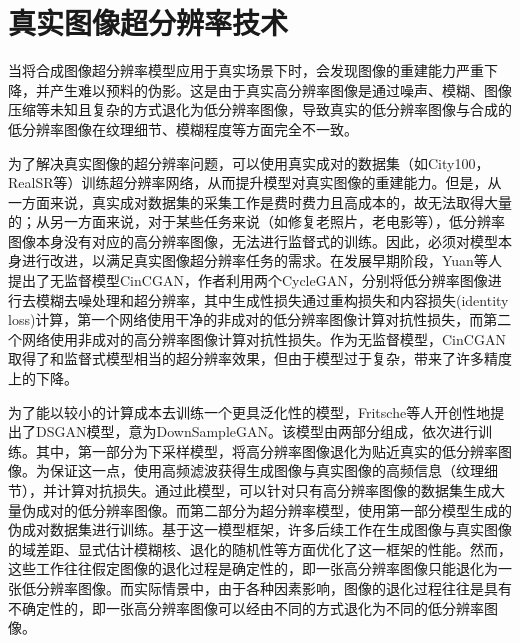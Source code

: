 \section{真实图像超分辨率技术}
当将合成图像超分辨率模型应用于真实场景下时，会发现图像的重建能力严重下降，并产生难以预料的伪影。这是由于真实高分辨率图像是通过噪声、模糊、图像压缩等未知且复杂的方式退化为低分辨率图像，导致真实的低分辨率图像与合成的低分辨率图像在纹理细节、模糊程度等方面完全不一致。

为了解决真实图像的超分辨率问题，可以使用真实成对的数据集（如City100\parencite{chen2019camera}，RealSR\parencite{cai2019toward}等）训练超分辨率网络，从而提升模型对真实图像的重建能力。但是，从一方面来说，真实成对数据集的采集工作是费时费力且高成本的，故无法取得大量的；从另一方面来说，对于某些任务来说（如修复老照片，老电影等），低分辨率图像本身没有对应的高分辨率图像，无法进行监督式的训练。因此，必须对模型本身进行改进，以满足真实图像超分辨率任务的需求。在发展早期阶段，Yuan等人\parencite{yuan2018unsupervised}提出了无监督模型CinCGAN，作者利用两个CycleGAN\parencite{zhu2017unpaired}，分别将低分辨率图像进行去模糊去噪处理和超分辨率，其中生成性损失通过重构损失和内容损失(identity loss)计算，第一个网络使用干净的非成对的低分辨率图像计算对抗性损失，而第二个网络使用非成对的高分辨率图像计算对抗性损失。作为无监督模型，CinCGAN取得了和监督式模型相当的超分辨率效果，但由于模型过于复杂，带来了许多精度上的下降。

为了能以较小的计算成本去训练一个更具泛化性的模型，Fritsche等人\parencite{fritsche2019frequency}开创性地提出了DSGAN模型，意为DownSampleGAN。该模型由两部分组成，依次进行训练。其中，第一部分为下采样模型，将高分辨率图像退化为贴近真实的低分辨率图像。为保证这一点，使用高频滤波获得生成图像与真实图像的高频信息（纹理细节），并计算对抗损失。通过此模型，可以针对只有高分辨率图像的数据集生成大量伪成对的低分辨率图像。而第二部分为超分辨率模型，使用第一部分模型生成的伪成对数据集进行训练。基于这一模型框架，许多后续工作在生成图像与真实图像的域差距、显式估计模糊核、退化的随机性等方面优化了这一框架的性能。然而，这些工作往往假定图像的退化过程是确定性的，即一张高分辨率图像只能退化为一张低分辨率图像。而实际情景中，由于各种因素影响，图像的退化过程往往是具有不确定性的，即一张高分辨率图像可以经由不同的方式退化为不同的低分辨率图像。

